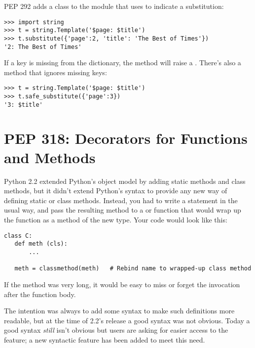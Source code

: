 \documentclass{howto}
\begin{document}
PEP 292 adds a  class to the  module
that uses \samp{\$} to indicate a substitution:

\begin{verbatim}
>>> import string
>>> t = string.Template('$page: $title')
>>> t.substitute({'page':2, 'title': 'The Best of Times'})
'2: The Best of Times'
\end{verbatim}


If a key is missing from the dictionary, the  method
will raise a .  There's also a 
method that ignores missing keys:

\begin{verbatim}
>>> t = string.Template('$page: $title')
>>> t.safe_substitute({'page':3})
'3: $title'
\end{verbatim}



\begin{seealso}
\end{seealso}


\section{PEP 318: Decorators for Functions and Methods}

Python 2.2 extended Python's object model by adding static methods and
class methods, but it didn't extend Python's syntax to provide any new
way of defining static or class methods.  Instead, you had to write a
 statement in the usual way, and pass the resulting
method to a  or 
function that would wrap up the function as a method of the new type.
Your code would look like this:

\begin{verbatim}
class C:
   def meth (cls):
       ...
   
   meth = classmethod(meth)   # Rebind name to wrapped-up class method
\end{verbatim}

If the method was very long, it would be easy to miss or forget the
 invocation after the function body.  

The intention was always to add some syntax to make such definitions
more readable, but at the time of 2.2's release a good syntax was not
obvious.  Today a good syntax \emph{still} isn't obvious but users are
asking for easier access to the feature; a new syntactic feature has
been added to meet this need.
\end{document}
